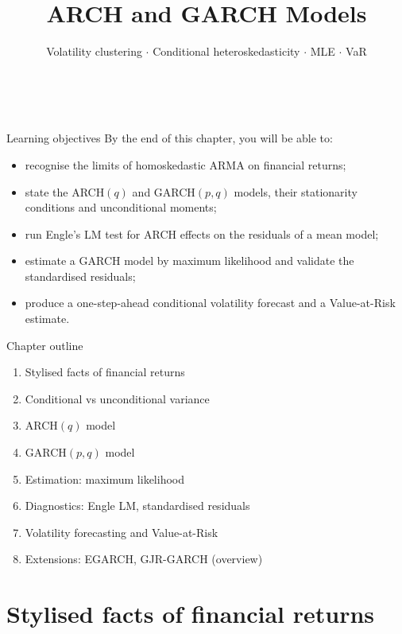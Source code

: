 \documentclass[aspectratio=169]{beamer}
\title[\moduleNom\ -- Ch.6]{ARCH and GARCH Models}
\subtitle{Volatility clustering $\cdot$ Conditional heteroskedasticity $\cdot$ MLE $\cdot$ VaR}
\author{\auteurNom \\ \footnotesize\auteurEmail}
\institute{\auteurInstitution}
\date{\anneeUniversitaire}
\begin{document}
\begin{frame}\titlepage\end{frame}

\begin{frame}{Learning objectives}
  By the end of this chapter, you will be able to:
  \begin{itemize}
    \item recognise the limits of homoskedastic ARMA on financial
          returns;
    \item state the ARCH$(q)$ and GARCH$(p,q)$ models, their
          stationarity conditions and unconditional moments;
    \item run Engle's LM test for ARCH effects on the residuals of a
          mean model;
    \item estimate a GARCH model by maximum likelihood and validate
          the standardised residuals;
    \item produce a one-step-ahead conditional volatility forecast
          and a Value-at-Risk estimate.
  \end{itemize}
\end{frame}

\begin{frame}{Chapter outline}
  \begin{enumerate}
    \item Stylised facts of financial returns
    \item Conditional vs unconditional variance
    \item ARCH$(q)$ model
    \item GARCH$(p,q)$ model
    \item Estimation: maximum likelihood
    \item Diagnostics: Engle LM, standardised residuals
    \item Volatility forecasting and Value-at-Risk
    \item Extensions: EGARCH, GJR-GARCH (overview)
  \end{enumerate}
\end{frame}

\section{Stylised facts of financial returns}
\end{document}
